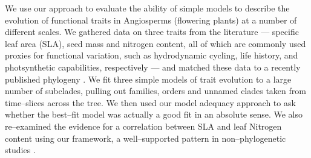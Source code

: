\documentclass[a4paper,12pt]{article}
\begin{document}


We use our approach to evaluate the ability of simple models to describe the evolution of functional traits in Angiosperms (flowering plants) at a number of different scales. We gathered data on three traits from the literature --- specific leaf area (SLA), seed mass and nitrogen content, all of which are commonly used proxies for functional variation, such as hydrodynamic cycling, life history, and photsynthetic capabilities, respectively \citep{Westoby2002} --- and matched these data to a recently published phylogeny \citep{Zanne2013}. We fit three simple models of trait evolution \citep[BM, OU, and EB, after][]{Harmon2010} to a large number of subclades, pulling out families, orders and unnamed clades taken from time--slices across the tree. We then used our model adequacy approach to ask whether the best--fit model was actually a good fit in an absolute sense. We also re--examined the evidence for a correlation between SLA and leaf Nitrogen content using our framework, a well--supported pattern in non--phylogenetic studies \citep[e.g.][]{Wright2004}.

\end{document}
